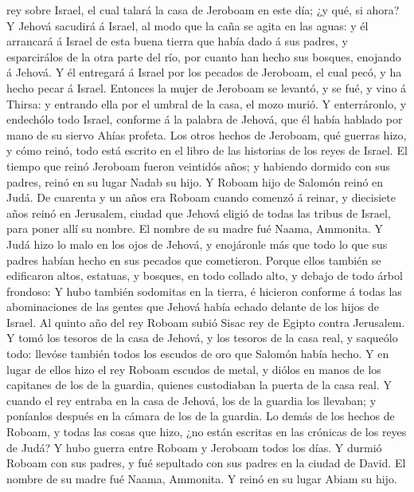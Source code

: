 rey sobre Israel, el cual talará la casa de Jeroboam en este día; ¿y
qué, si ahora?  Y Jehová sacudirá á Israel, al modo que la
caña se agita en las aguas: y él arrancará á Israel de esta buena tierra
que había dado á sus padres, y esparcirálos de la otra parte del río,
por cuanto han hecho sus bosques, enojando á Jehová.  Y él
entregará á Israel por los pecados de Jeroboam, el cual pecó, y ha hecho
pecar á Israel.  Entonces la mujer de Jeroboam se levantó,
y se fué, y vino á Thirsa: y entrando ella por el umbral de la casa, el
mozo murió.  Y enterráronlo, y endechólo todo Israel,
conforme á la palabra de Jehová, que él había hablado por mano de su
siervo Ahías profeta.  Los otros hechos de Jeroboam, qué
guerras hizo, y cómo reinó, todo está escrito en el libro de las
historias de los reyes de Israel.  El tiempo que reinó
Jeroboam fueron veintidós años; y habiendo dormido con sus padres, reinó
en su lugar Nadab su hijo.  Y Roboam hijo de Salomón reinó
en Judá. De cuarenta y un años era Roboam cuando comenzó á reinar, y
diecisiete años reinó en Jerusalem, ciudad que Jehová eligió de todas
las tribus de Israel, para poner allí su nombre. El nombre de su madre
fué Naama, Ammonita.  Y Judá hizo lo malo en los ojos de
Jehová, y enojáronle más que todo lo que sus padres habían hecho en sus
pecados que cometieron.  Porque ellos también se edificaron
altos, estatuas, y bosques, en todo collado alto, y debajo de todo árbol
frondoso:  Y hubo también sodomitas en la tierra, é
hicieron conforme á todas las abominaciones de las gentes que Jehová
había echado delante de los hijos de Israel.  Al quinto año
del rey Roboam subió Sisac rey de Egipto contra Jerusalem. 
Y tomó los tesoros de la casa de Jehová, y los tesoros de la casa real,
y saqueólo todo: llevóse también todos los escudos de oro que Salomón
había hecho.  Y en lugar de ellos hizo el rey Roboam
escudos de metal, y diólos en manos de los capitanes de los de la
guardia, quienes custodiaban la puerta de la casa real.  Y
cuando el rey entraba en la casa de Jehová, los de la guardia los
llevaban; y poníanlos después en la cámara de los de la guardia.
 Lo demás de los hechos de Roboam, y todas las cosas que
hizo, ¿no están escritas en las crónicas de los reyes de Judá?
 Y hubo guerra entre Roboam y Jeroboam todos los días.
 Y durmió Roboam con sus padres, y fué sepultado con sus
padres en la ciudad de David. El nombre de su madre fué Naama, Ammonita.
Y reinó en su lugar Abiam su hijo.

